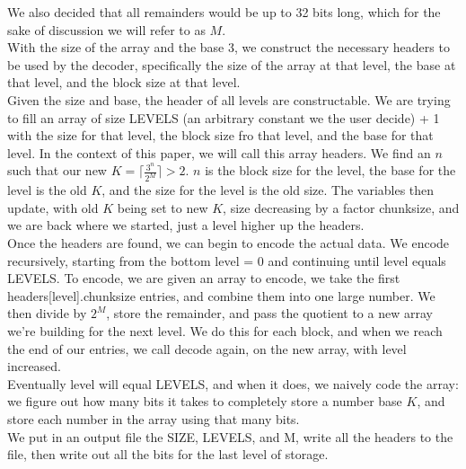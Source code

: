 \documentclass{article}
\begin{document}
We also decided that all remainders would be up to 32 bits long, which for the sake of discussion we will refer to as $M$.\\

With the size of the array and the base 3, we construct the necessary headers to be used by the decoder, specifically the size of the array at that level, the base at that level, and the block size at that level. \\

Given the size and base, the header of all levels are constructable. We are trying to fill an array of size LEVELS (an arbitrary constant we the user decide) + 1 with the size for that level, the block size fro that level, and the base for that level. In the context of this paper, we will call this array headers. We find an $n$ such that our new $K = \lceil \frac{3^n}{2^M} \rceil > 2$. $n$ is the block size for the level, the base for the level is the old $K$, and the size for the level is the old size. The variables then update, with old $K$ being set to new $K$, size decreasing by a factor chunksize, and we are back where we started, just a level higher up the headers.\\

Once the headers are found, we can begin to encode the actual data. We encode recursively, starting from the bottom level = 0 and continuing until level equals LEVELS. To encode, we are given an array to encode, we take the first headers[level].chunksize entries, and combine them into one large number. We then divide by $2^M$, store the remainder, and pass the quotient to a new array we're building for the next level. We do this for each block, and when we reach the end of our entries, we call decode again, on the new array, with level increased.\\

Eventually level will equal LEVELS, and when it does, we naively code the array: we figure out how many bits it takes to completely store a number base $K$, and store each number in the array using that many bits. \\

We put in an output file the SIZE, LEVELS, and M, write all the headers to the file, then write out all the bits for the last level of storage. \\\\

%		
%	
\end{document}
